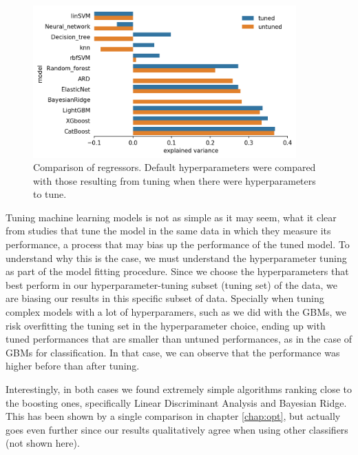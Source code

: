  
\begin{figure}[ht]
        \centering
        \includegraphics[width=0.9\textwidth]{figures/plots/regressor_hyperopt.png}
        \caption[Comparison of classifiers]{Comparison of regressors. Default hyperparameters were compared with those resulting from tuning when there were hyperparameters to tune.}
        \label{fig:reg_comparison}
\end{figure}

Tuning machine learning models is not as simple as it may seem, what it clear from studies that tune the model in the same data in which they measure its performance, a process that may bias up the performance of the tuned model. To understand why this is the case, we must understand the hyperparameter tuning as part of the model fitting procedure. Since we choose the hyperparameters that best perform in our hyperparameter-tuning subset (tuning set) of the data, we are biasing our results in this specific subset of data. Specially when tuning complex models with a lot of hyperparamers, such as we did with the GBMs, we risk overfitting the tuning set in the hyperparameter choice, ending up with tuned performances that are smaller than untuned performances, as in the case of GBMs for classification. In that case, we can observe that the performance was higher before than after tuning.

Interestingly, in both cases we found extremely simple algorithms ranking close to the boosting ones, specifically Linear Discriminant Analysis and Bayesian Ridge. This has been shown by a single comparison in chapter \ref{chap:opt}, but actually goes even further since our results qualitatively agree when using other classifiers (not shown here). 

